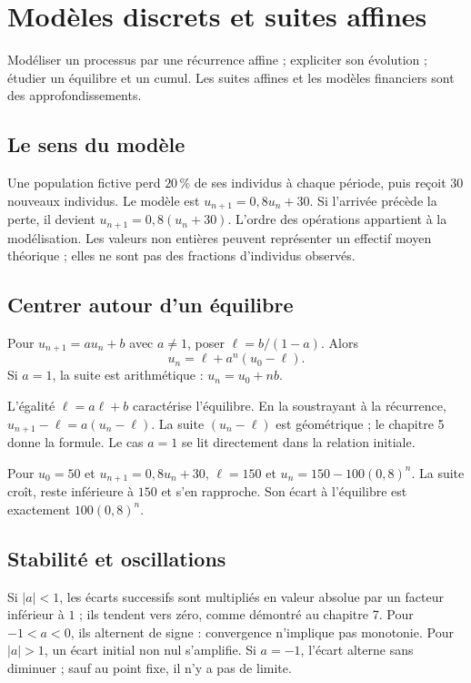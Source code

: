 \documentclass[../cours_1re.tex]{subfiles}
\begin{document}
\setcounter{chapter}{5}
\chapter{Modèles discrets et suites affines}
\label{ch:06}
\begin{objectif}
Modéliser un processus par une récurrence affine ; expliciter son évolution ; étudier un équilibre et un cumul. Les suites affines et les modèles financiers sont des approfondissements.
\end{objectif}
\section{Le sens du modèle}
Une population fictive perd $20\,\%$ de ses individus à chaque période, puis reçoit $30$ nouveaux individus. Le modèle est $u_{n+1}=0{,}8u_n+30$.
Si l'arrivée précède la perte, il devient $u_{n+1}=0{,}8(u_n+30)$. L'ordre des opérations appartient à la modélisation.
Les valeurs non entières peuvent représenter un effectif moyen théorique ; elles ne sont pas des fractions d'individus observés.
\section{Centrer autour d'un équilibre}
\begin{theoreme}
Pour $u_{n+1}=au_n+b$ avec $a\ne1$, poser $\ell=b/(1-a)$. Alors
\[
u_n=\ell+a^n(u_0-\ell).
\]
Si $a=1$, la suite est arithmétique : $u_n=u_0+nb$.
\end{theoreme}
\begin{demonstration}
L'égalité $\ell=a\ell+b$ caractérise l'équilibre. En la soustrayant à la récurrence,
$u_{n+1}-\ell=a(u_n-\ell)$. La suite $(u_n-\ell)$ est géométrique ; le chapitre 5 donne la formule. Le cas $a=1$ se lit directement dans la relation initiale.
\end{demonstration}
\begin{exemple}
Pour $u_0=50$ et $u_{n+1}=0{,}8u_n+30$, $\ell=150$ et $u_n=150-100(0{,}8)^n$.
La suite croît, reste inférieure à $150$ et s'en rapproche. Son écart à l'équilibre est exactement $100(0{,}8)^n$.
\end{exemple}
\section{Stabilité et oscillations}
Si $|a|<1$, les écarts successifs sont multipliés en valeur absolue par un facteur inférieur à $1$ ; ils tendent vers zéro, comme démontré au chapitre 7.
Pour $-1<a<0$, ils alternent de signe : convergence n'implique pas monotonie.
Pour $|a|>1$, un écart initial non nul s'amplifie. Si $a=-1$, l'écart alterne sans diminuer ; sauf au point fixe, il n'y a pas de limite.
\end{document}
